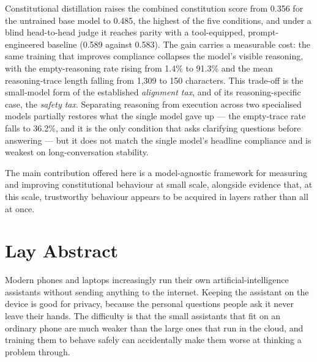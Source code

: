 \documentclass[a4paper,oneside,12pt]{book}
\numberwithin{equation}{chapter} %
\numberwithin{algorithm}{chapter} %
\begin{document}
Constitutional distillation raises the combined constitution score from 0.356 for the untrained base model to 0.485, the highest of the five conditions, and under a blind head-to-head judge it reaches parity with a tool-equipped, prompt-engineered baseline (0.589 against 0.583). The gain carries a measurable cost: the same training that improves compliance collapses the model's visible reasoning, with the empty-reasoning rate rising from 1.4\% to 91.3\% and the mean reasoning-trace length falling from 1{,}309 to 150 characters. This trade-off is the small-model form of the established \emph{alignment tax}, and of its reasoning-specific case, the \emph{safety tax}. Separating reasoning from execution across two specialised models partially restores what the single model gave up --- the empty-trace rate falls to 36.2\%, and it is the only condition that asks clarifying questions before answering --- but it does not match the single model's headline compliance and is weakest on long-conversation stability.

The main contribution offered here is a model-agnostic framework for measuring and improving constitutional behaviour at small scale, alongside evidence that, at this scale, trustworthy behaviour appears to be acquired in layers rather than all at once.

\chapter*{Lay Abstract}
Modern phones and laptops increasingly run their own artificial-intelligence assistants without sending anything to the internet. Keeping the assistant on the device is good for privacy, because the personal questions people ask it never leave their hands. The difficulty is that the small assistants that fit on an ordinary phone are much weaker than the large ones that run in the cloud, and training them to behave safely can accidentally make them worse at thinking a problem through.
\end{document}
